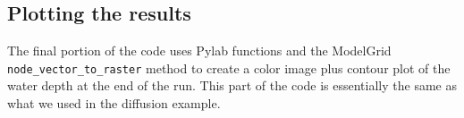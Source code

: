 \documentclass[12pt]{article}
\newcommand{\code}[1]{{\tt #1}}
\begin{document}
\subsection{Plotting the results}



The final portion of the code uses Pylab functions and the ModelGrid \code{node\_vector\_to\_raster} method to create a color image plus contour plot of the water depth at the end of the run. This part of the code is essentially the same as what we used in the diffusion example.




 
\newpage


\end{document}

